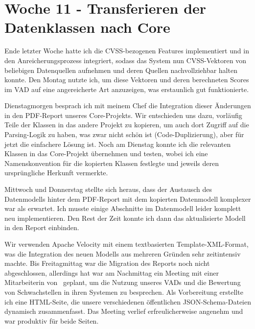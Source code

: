 \section{Woche 11 - Transferieren der Datenklassen nach Core} \label{sec:bericht-wo-11}


\lweekdaymarginpar{\weekdayMondayLong}

Ende letzter Woche hatte ich die CVSS-bezogenen Features implementiert und in den Anreicherungsprozess integriert, sodass das System nun CVSS-Vektoren von beliebigen Datenquellen aufnehmen und deren Quellen nachvollziehbar halten konnte.
Den Montag nutzte ich, um diese Vektoren und deren berechneten Scores im VAD auf eine angereicherte Art anzuzeigen, was erstaunlich gut funktionierte.

\sweekdaymarginpar{\weekdayTuesdayLong}

Dienstagmorgen besprach ich mit meinem Chef die Integration dieser Änderungen in den PDF-Report unseres Core-Projekts.
Wir entschieden uns dazu, vorläufig Teile der Klassen in das andere Projekt zu kopieren, um auch dort Zugriff auf die Parsing-Logik zu haben, was zwar nicht schön ist (Code-Duplizierung), aber für jetzt die einfachere Lösung ist.
Noch am Dienstag konnte ich die relevanten Klassen in das Core-Projekt übernehmen und testen, wobei ich eine Namenskonvention für die kopierten Klassen festlegte und jeweils deren ursprüngliche Herkunft vermerkte.

\sweekdaymarginpar{\weekdayWednesdayShort\ - \weekdayFridayShort}

Mittwoch und Donnerstag stellte sich heraus, dass der Austausch des Datenmodells hinter dem PDF-Report mit dem kopierten Datenmodell komplexer war als erwartet.
Ich musste einige Abschnitte im Datenmodell leider komplett neu implementieren.
Den Rest der Zeit konnte ich dann das aktualisierte Modell in den Report einbinden.

Wir verwenden Apache Velocity mit einem textbasierten Template-XML-Format, was die Integration des neuen Modells aus mehreren Gründen sehr zeitintensiv machte.
Bis Freitagmittag war die Migration des Reports noch nicht abgeschlossen, allerdings hat war am Nachmittag ein Meeting mit einer Mitarbeiterin von \aeclientZEZESE\ geplant, um die Nutzung unseres VADs und die Bewertung von Schwachstellen in ihren Systemen zu besprechen.
Als Vorbereitung erstellte ich eine HTML-Seite, die unsere verschiedenen öffentlichen JSON-Schema-Dateien dynamisch zusammenfasst.
Das Meeting verlief erfreulicherweise angenehm und war produktiv für beide Seiten.

